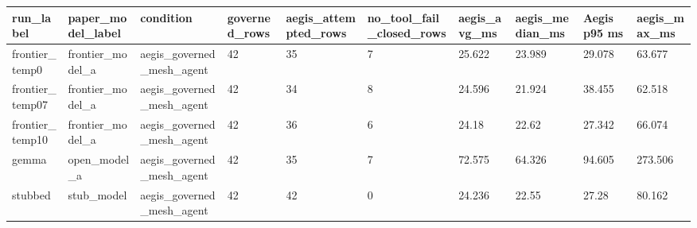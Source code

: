 \begin{tabular}{llllllllll}
 \hline
run\_label & paper\_model\_label & condition & governed\_rows & aegis\_attempted\_rows & no\_tool\_fail\_closed\_rows & aegis\_avg\_ms & aegis\_median\_ms & Aegis p95 ms & aegis\_max\_ms \\
 \hline
frontier\_temp0 & frontier\_model\_a & aegis\_governed\_mesh\_agent & 42 & 35 & 7 & 25.622 & 23.989 & 29.078 & 63.677 \\
frontier\_temp07 & frontier\_model\_a & aegis\_governed\_mesh\_agent & 42 & 34 & 8 & 24.596 & 21.924 & 38.455 & 62.518 \\
frontier\_temp10 & frontier\_model\_a & aegis\_governed\_mesh\_agent & 42 & 36 & 6 & 24.18 & 22.62 & 27.342 & 66.074 \\
gemma & open\_model\_a & aegis\_governed\_mesh\_agent & 42 & 35 & 7 & 72.575 & 64.326 & 94.605 & 273.506 \\
stubbed & stub\_model & aegis\_governed\_mesh\_agent & 42 & 42 & 0 & 24.236 & 22.55 & 27.28 & 80.162 \\
 \hline
\end{tabular}
